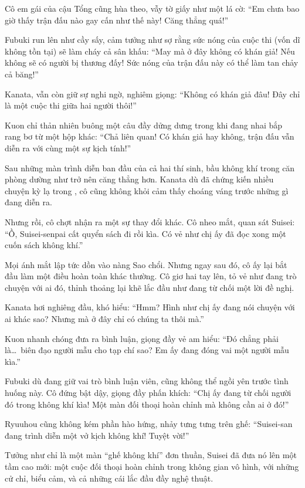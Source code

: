 \documentclass[../main.tex]{subfiles}
\begin{document}
Cô em gái của cậu Tổng cũng hùa theo, vẫy tờ giấy như một lá cờ: ``Em chưa bao giờ thấy trận đấu nào gay cấn như thế này! Căng thẳng quá!''

Fubuki run lên như cầy sấy, cảm tưởng như sợ rằng sức nóng của cuộc thi (vốn dĩ không tồn tại) sẽ làm cháy cả sân khấu: ``May mà ở đây không có khán giả! Nếu không sẽ có người bị thương đấy! Sức nóng của trận đấu này có thể làm tan chảy cả băng!''

Kanata, vẫn còn giữ sự nghi ngờ, nghiêm giọng: ``Không có khán giả đâu! Đây chỉ là một cuộc thi giữa hai người thôi!''

Kuon chỉ thản nhiên buông một câu đầy dửng dưng trong khi đang nhai bắp rang bơ từ một hộp khác: ``Chả liên quan! Có khán giả hay không, trận đấu vẫn diễn ra với cùng một sự kịch tính!''

Sau những màn trình diễn ban đầu của cả hai thí sinh, bầu không khí trong căn phòng dường như trở nên căng thẳng hơn. Kanata dù đã chứng kiến nhiều chuyện kỳ lạ trong \hll, cô cũng không khỏi cảm thấy choáng váng trước những gì đang diễn ra.

Nhưng rồi, cô chợt nhận ra một sự thay đổi khác. Cô nheo mắt, quan sát Suisei: ``Ồ, Suisei-senpai cất quyển sách đi rồi kìa. Có vẻ như chị ấy đã đọc xong một cuốn sách không khí.''

Mọi ánh mắt lập tức dồn vào nàng Sao chổi. Nhưng ngay sau đó, cô ấy lại bắt đầu làm một điều hoàn toàn khác thường. Cô giơ hai tay lên, tỏ vẻ như đang trò chuyện với ai đó, thỉnh thoảng lại khẽ lắc đầu như đang từ chối một lời đề nghị.


Kanata hơi nghiêng đầu, khó hiểu: ``Hmm? Hình như chị ấy đang nói chuyện với ai khác sao? Nhưng mà ở đây chỉ có chúng ta thôi mà.''

Kuon nhanh chóng đưa ra bình luận, giọng đầy vẻ am hiểu: ``Đó chẳng phải là\dots\ biên đạo người mẫu cho tạp chí sao? Em ấy đang đóng vai một người mẫu kìa.''

Fubuki dù đang giữ vai trò bình luận viên, cũng không thể ngồi yên trước tình huống này. Cô đứng bật dậy, giọng đầy phấn khích: ``Chị ấy đang từ chối người đó trong không khí kìa! Một màn đối thoại hoàn chỉnh mà không cần ai ở đó!''

Ryuuhou cũng không kém phần hào hứng, nhảy tưng tưng trên ghế: ``Suisei-san đang trình diễn một vở kịch không khí! Tuyệt vời!''

Tưởng như chỉ là một màn ``ghế không khí'' đơn thuần, Suisei đã đưa nó lên một tầm cao mới: một cuộc đối thoại hoàn chỉnh trong không gian vô hình, với những cử chỉ, biểu cảm, và cả những cái lắc đầu đầy nghệ thuật.
\end{document}
